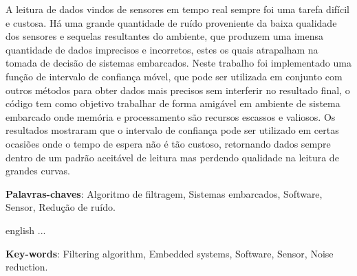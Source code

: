 \setlength{\absparsep}{18pt} %
\begin{resumo}
	A leitura de dados vindos de sensores em tempo real sempre foi uma tarefa difícil e custosa. Há uma grande quantidade de ruído proveniente da baixa qualidade dos sensores e sequelas resultantes do ambiente, que produzem uma imensa quantidade de dados imprecisos e incorretos, estes os quais atrapalham na tomada de decisão de sistemas embarcados. 
	Neste trabalho foi implementado uma função de intervalo de confiança móvel, que pode ser utilizada em conjunto com outros métodos para obter dados mais precisos sem interferir no resultado final, o código tem como objetivo trabalhar de forma amigável em ambiente de sistema embarcado onde memória e processamento são recursos escassos e valiosos. Os resultados mostraram que o intervalo de confiança pode ser utilizado em certas ocasiões onde o tempo de espera não é tão custoso, retornando dados sempre dentro de um padrão aceitável de leitura mas perdendo qualidade na leitura de grandes curvas.
	



	\textbf{Palavras-chaves}: Algoritmo de filtragem, Sistemas embarcados, Software, Sensor, Redução de ruído.
\end{resumo}

\begin{resumo}[Abstract]
	\begin{otherlanguage*}{english}
		...
		\vspace{\onelineskip}

		\noindent
		\textbf{Key-words}: Filtering algorithm, Embedded systems, Software, Sensor, Noise reduction.
	\end{otherlanguage*}
\end{resumo}


